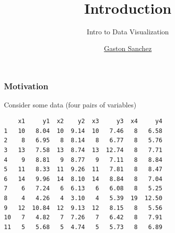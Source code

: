 \documentclass[12pt]{beamer}\usepackage[]{graphicx}\usepackage[]{color}
\title{Introduction}
\subtitle{Intro to Data Visualization}
\author{\href{http://www.gastonsanchez.com}{Gaston Sanchez}}
\institute{\href{https://creativecommons.org/licenses/by-sa/4.0/}{\tt \scriptsize \color{foreground} CC BY-SA 4.0}}
\date{}
\makeatletter
\newenvironment{kframe}{%
 \def\at@end@of@kframe{}%
 \ifinner\ifhmode%
  \def\at@end@of@kframe{\end{minipage}}%
  \begin{minipage}{\columnwidth}%
 \fi\fi%
 \def\FrameCommand##1{\hskip\@totalleftmargin \hskip-\fboxsep
 \colorbox{shadecolor}{##1}\hskip-\fboxsep
     \hskip-\linewidth \hskip-\@totalleftmargin \hskip\columnwidth}%
 \MakeFramed {\advance\hsize-\width
   \@totalleftmargin\z@ \linewidth\hsize
   \@setminipage}}%
 {\par\unskip\endMakeFramed%
 \at@end@of@kframe}
\newenvironment{knitrout}{}{} %
\makeatother
\begin{document}
{
  \frame{\titlepage} 
}


\begin{frame}
\begin{center}
\Huge{}
\end{center}
\end{frame}


\begin{frame}[fragile]
\frametitle{Motivation}

Consider some data (four pairs of variables)
\begin{knitrout}\footnotesize
{}\color{fgcolor}\begin{kframe}
\begin{verbatim}
    x1     y1  x2    y2  x3     y3  x4     y4
1   10   8.04  10  9.14  10   7.46   8   6.58
2    8   6.95   8  8.14   8   6.77   8   5.76
3   13   7.58  13  8.74  13  12.74   8   7.71
4    9   8.81   9  8.77   9   7.11   8   8.84
5   11   8.33  11  9.26  11   7.81   8   8.47
6   14   9.96  14  8.10  14   8.84   8   7.04
7    6   7.24   6  6.13   6   6.08   8   5.25
8    4   4.26   4  3.10   4   5.39  19  12.50
9   12  10.84  12  9.13  12   8.15   8   5.56
10   7   4.82   7  7.26   7   6.42   8   7.91
11   5   5.68   5  4.74   5   5.73   8   6.89
\end{verbatim}
\end{kframe}
\end{knitrout}

\end{frame}


\begin{frame}
\begin{center}
\large{}
\end{center}
\end{frame}

\end{document}

